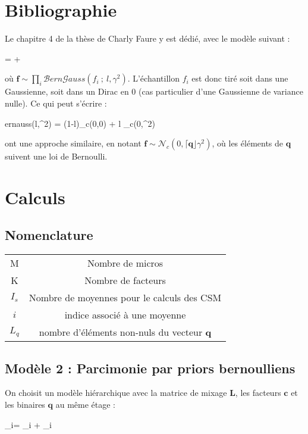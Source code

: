\documentclass[ 12pt]{article}
\renewenvironment{equation}{\vspace{-0.2cm}\begin{oldequation}}{\vspace{-0.2cm}\end{oldequation}}
\newcommand{\diag}[1]{\lceil#1\rfloor}
\begin{document}
\section{Bibliographie}
Le chapitre 4 de la thèse de Charly Faure y est dédié, avec le modèle suivant : 
\begin{equation}
        = + 
\end{equation}
où $\bm{f} \sim \prod_i \mathcal{B}ern\mathcal{G}auss(f_i~;~ l,\gamma^2)$. L'échantillon $f_i$ est donc tiré soit dans une Gaussienne, soit dans un Dirac en 0 (cas particulier d'une Gaussienne de variance nulle). Ce qui peut s'écrire : 
\begin{equation}
        ernauss(l,\gamma^2) = (1-l)_c(0,0) + l _c(0,\gamma^2)
\end{equation}

\cite{Ge2011} ont une approche similaire, en notant $\bm{f} \sim \mathcal{N}_c(0,\diag{\bm{q}}\gamma^2)$, où les éléments de $\bm{q}$ suivent une loi de Bernoulli.


\section{Calculs}
\subsection{Nomenclature}
\begin{tabular}{c c}
M & Nombre de micros\\
K & Nombre de facteurs\\
$I_{s}$ & Nombre de moyennes pour le calculs des CSM\\
$i$ & indice associé à une moyenne\\
$L_q$ & nombre d'éléments non-nuls du vecteur $\bm{q}$

\end{tabular}

\subsection{Modèle 2 : Parcimonie par priors bernoulliens}
On choisit un modèle hiérarchique avec la matrice de mixage $\bm{L}$, les facteurs $\bm{c}$ et les binaires $\bm{q}$ au même étage :
\begin{equation}
        _i= \bm{L  \diag{q} c }_i + _i
\end{equation}
\end{document}
